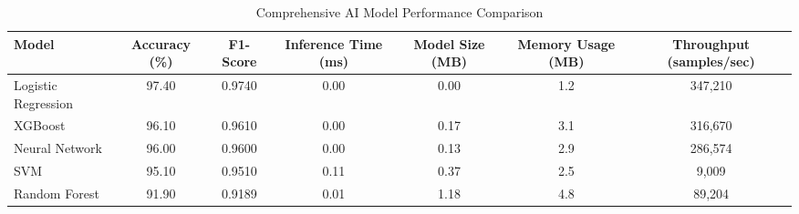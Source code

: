 \begin{table}[htbp]
\centering
\caption{Comprehensive AI Model Performance Comparison}
\label{tab:model_comparison}
\begin{tabular}{|l|c|c|c|c|c|c|}
\hline
\textbf{Model} & \textbf{Accuracy (\%)} & \textbf{F1-Score} & \textbf{Inference Time (ms)} & \textbf{Model Size (MB)} & \textbf{Memory Usage (MB)} & \textbf{Throughput (samples/sec)} \\
\hline
Logistic Regression & 97.40 & 0.9740 & 0.00 & 0.00 & 1.2 & 347,210 \\
XGBoost & 96.10 & 0.9610 & 0.00 & 0.17 & 3.1 & 316,670 \\
Neural Network & 96.00 & 0.9600 & 0.00 & 0.13 & 2.9 & 286,574 \\
SVM & 95.10 & 0.9510 & 0.11 & 0.37 & 2.5 & 9,009 \\
Random Forest & 91.90 & 0.9189 & 0.01 & 1.18 & 4.8 & 89,204 \\
\hline
\end{tabular}
\end{table}